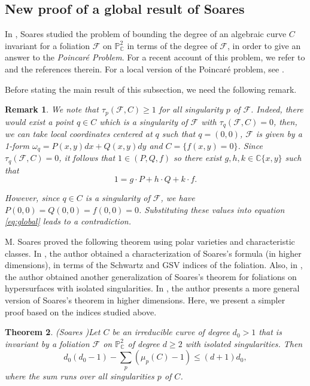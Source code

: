 \documentclass[11pt]{amsart}
\newcommand{\C}{\mathbb{C}}
\newcommand{\F}{\mathcal{F}}
\newtheorem{theorem}{Theorem}[section]
\newtheorem{remark}[theorem]{Remark}
\begin{document}
\subsection{New proof of a global result of Soares}
In \cite{Soares}, Soares  studied the problem of bounding the degree of an algebraic curve $C$ invariant for a foliation $\F$ on $\mathbb{P}^2_\C$ in terms of the degree of $\F$, in order to give an answer to the
 \textit{Poincaré Problem}. For a recent account of this problem, we refer to \cite{Correa} and the references therein. For a local version of the Poincar\'e problem, see \cite{Fortuny}. 
\par Before stating the main result of this subsection, we need the following remark.

\begin{remark}\label{remar1}
    We note that $\tau_p(\F,C)\geq 1$ for all  singularity $p$ of $\F$. Indeed,  there would exist a point $q\in C$ which is a singularity of $\F$ with $\tau_q(\F,C)=0$, then,  we can take local coordinates centered at $q$ such that $q=(0,0)$, $\F$ is given by a 1-form $\omega_q=P(x,y)dx+Q(x,y)dy$ and $C=\{f(x,y)=0\}$. Since   $\tau_q(\F,C)=0$, it follows that $1\in(P,Q,f)$ so there exist $g,h,k\in\C\{x,y\}$ such that 
    \begin{equation}\label{eq:global}
    1=g\cdot P+h\cdot Q+k\cdot f.
    \end{equation}
    
    However, since $q\in C$ is a singularity of $\F$, we have $P(0,0)=Q(0,0)=f(0,0)=0$. Substituting these values into equation \eqref{eq:global} leads to a contradiction.
\end{remark}
\par M. Soares proved the following theorem using polar varieties and characteristic classes.
In \cite{machado3}, the author obtained a characterization of Soares’s formula (in higher dimensions), in terms of the Schwartz and GSV indices of the foliation. Also, in \cite{machado2}, the author obtained another generalization of Soares’s theorem for foliations on hypersurfaces with isolated singularities. In \cite{Machado1}, the author presents a more general version of Soares’s theorem in higher dimensions.
Here, we present a simpler proof based on the indices studied above. 
\begin{theorem}(Soares \cite[Theorem II]{Soares})\label{Soares ine}
Let $C$ be an irreducible curve of degree $d_0>1$ that is invariant by a foliation $\F$ on $\mathbb{P}^2_\C$ of degree $d\geq 2$ with isolated singularities. Then
\[d_0(d_0-1)-\sum_{p}(\mu_p(C)-1)\leq (d+1)d_0,\]
where the sum runs over all singularities $p$ of $C$.    
\end{theorem}
\end{document}
